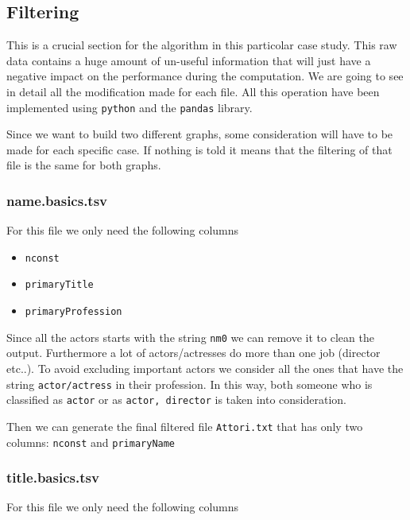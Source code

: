 \newpage
\subsection{Filtering} \label{filtering}

This is a crucial section for the algorithm in this particolar case study. This raw data contains a huge amount of un-useful information that will just have a negative impact on the performance during the computation. We are going to see in detail all the modification made for each file. All this operation have been implemented using \texttt{python} and the \texttt{pandas} library. \s

\nd Since we want to build two different graphs, some consideration will have to be made for each specific case. If nothing is told it means that the filtering of that file is the same for both graphs.

\subsubsection{name.basics.tsv}

For this file we only need the following columns

\begin{itemize}
    \item \texttt{nconst}
    \item \texttt{primaryTitle}
    \item \texttt{primaryProfession}
\end{itemize}
Since all the actors starts with the string \texttt{nm0} we can remove it to clean the output. Furthermore a lot of actors/actresses do more than one job (director etc..). To avoid excluding important actors we consider all the ones that have the string \texttt{actor/actress} in their profession. In this way, both someone who is classified as \texttt{actor} or as \texttt{actor, director} is taken into consideration. \s

\noindent Then we can generate the final filtered file \texttt{Attori.txt} that has only two columns: \texttt{nconst} and \texttt{primaryName}


\subsubsection{title.basics.tsv}

For this file we only need the following columns

